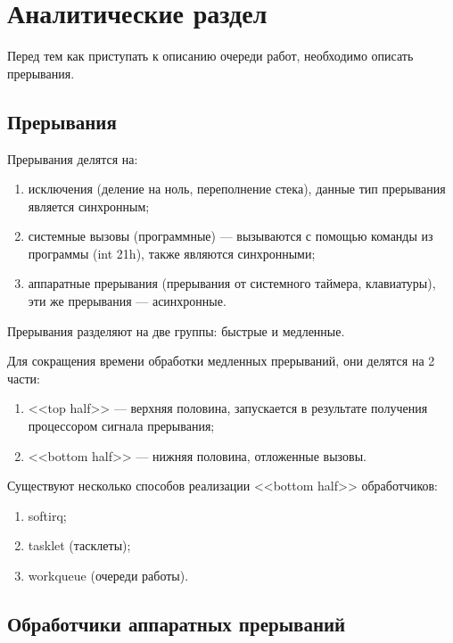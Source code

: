 \section{\large Аналитические раздел}

Перед тем как приступать к описанию очереди работ, необходимо описать прерывания.

\subsection{Прерывания}

Прерывания делятся на:

\begin{enumerate}
    \item исключения (деление на ноль, переполнение стека), данные тип прерывания является синхронным;
    \item системные вызовы (программные) --- вызываются с помощью команды из программы (int 21h), также являются синхронными;
    \item аппаратные прерывания (прерывания от системного таймера, клавиатуры), эти же прерывания --- асинхронные.
\end{enumerate}

Прерывания разделяют на две группы: быстрые и медленные.

Для сокращения времени обработки медленных прерываний, они делятся на 2 части:

\begin{enumerate}
    \item <<top half>> --- верхняя половина, запускается в результате получения процессором сигнала прерывания;
    \item <<bottom half>> --- нижняя половина, отложенные вызовы.
\end{enumerate}

Существуют несколько способов реализации <<bottom half>> обработчиков:

\begin{enumerate}
    \item softirq;
    \item tasklet (тасклеты);
    \item workqueue (очереди работы).
\end{enumerate}

\subsection{Обработчики аппаратных прерываний}

